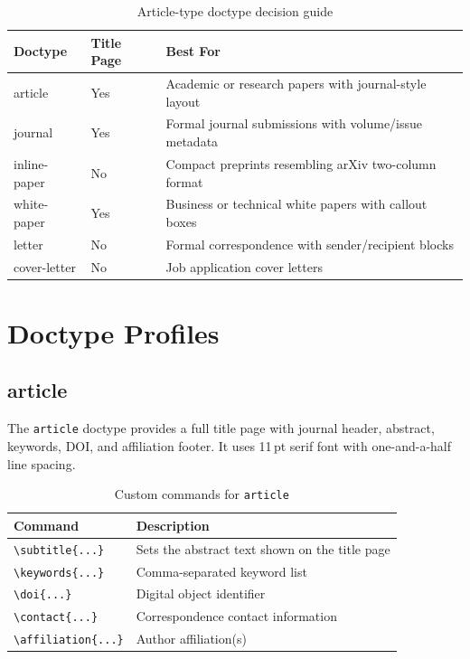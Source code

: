 \begin{table}[htbp]
    \centering
    \caption{Article-type doctype decision guide}
    \label{tab:article-decision}
    \begin{tabular}{@{} l l p{6.5cm} @{}}
        \toprule
        \textbf{Doctype} & \textbf{Title Page} & \textbf{Best For} \\
        \midrule
        article        & Yes & Academic or research papers with journal-style layout \\
        journal        & Yes & Formal journal submissions with volume/issue metadata \\
        inline-paper   & No  & Compact preprints resembling arXiv two-column format \\
        white-paper    & Yes & Business or technical white papers with callout boxes \\
        letter         & No  & Formal correspondence with sender/recipient blocks \\
        cover-letter   & No  & Job application cover letters \\
        \bottomrule
    \end{tabular}
\end{table}

\section{Doctype Profiles}

\subsection{article}

The \texttt{article} doctype provides a full title page with journal header,
abstract, keywords, DOI, and affiliation footer.  It uses 11\,pt serif font
with one-and-a-half line spacing.

\begin{table}[htbp]
    \centering
    \caption{Custom commands for \texttt{article}}
    \label{tab:article-commands}
    \begin{tabular}{@{} l p{8cm} @{}}
        \toprule
        \textbf{Command} & \textbf{Description} \\
        \midrule
        \texttt{\textbackslash subtitle\{...\}}     & Sets the abstract text shown on the title page \\
        \texttt{\textbackslash keywords\{...\}}     & Comma-separated keyword list \\
        \texttt{\textbackslash doi\{...\}}          & Digital object identifier \\
        \texttt{\textbackslash contact\{...\}}      & Correspondence contact information \\
        \texttt{\textbackslash affiliation\{...\}}  & Author affiliation(s) \\
        \bottomrule
    \end{tabular}
\end{table}

